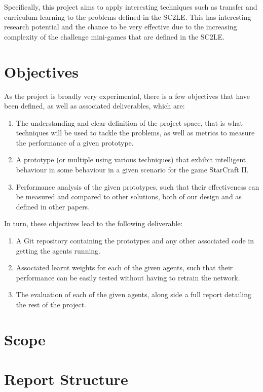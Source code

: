Specifically, this project aims to apply interesting techniques such as
transfer and curriculum learning to the problems defined in the SC2LE\@.
This has interesting research potential and the chance to be very effective
due to the increasing complexity of the challenge mini-games that are defined
in the SC2LE\@.

\section{Objectives}

As the project is broadly very experimental, there is a few objectives that
have been defined, as well as associated deliverables, which are:

\begin{enumerate}
    \item The understanding and clear definition of the project space, that is
        what techniques will be used to tackle the problems, as well as
        metrics to measure the performance of a given prototype.
    \item A prototype (or multiple using various techniques) that exhibit
        intelligent behaviour in some behaviour in a given scenario for
        the game StarCraft II\@.
    \item Performance analysis of the given prototypes, such that their
        effectiveness can be measured and compared to other solutions, both of
        our design and as defined in other papers.
\end{enumerate}

In turn, these objectives lead to the following deliverable:

\begin{enumerate}
    \item A Git repository containing the prototypes and any other associated
        code in getting the agents running.
    \item Associated learnt weights for each of the given agents, such that
        their performance can be easily tested without having to retrain
        the network.
    \item The evaluation of each of the given agents, along side a full report
        detailing the rest of the project.
\end{enumerate}

\section{Scope}

\section{Report Structure}
